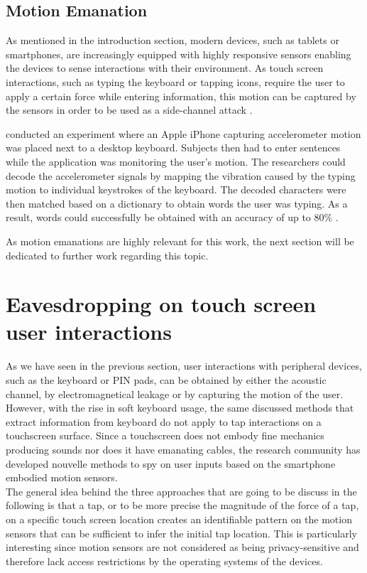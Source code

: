 \subsection{Motion Emanation}
As mentioned in the introduction section, modern devices, such as tablets or smartphones, are increasingly equipped with highly responsive sensors enabling the devices to sense interactions with their environment. As touch screen interactions, such as typing the keyboard or tapping icons, require the user to apply a certain force while entering information, this motion can be captured by the sensors in order to be used as a side-channel attack \cite{Tapprints,Accessory,Touchlogger}.

\citeauthor{Marquardt:2011:IDV:2046707.2046771} conducted an experiment where an Apple iPhone capturing accelerometer motion was placed next to a desktop keyboard. Subjects then had to enter sentences while the application was monitoring the user's motion. The researchers could decode the accelerometer signals by mapping the vibration caused by the typing motion to individual keystrokes of the keyboard. The decoded characters were then matched based on a dictionary to obtain words the user was typing. As a result, words could successfully be obtained with an accuracy of up to 80\% \cite{Marquardt:2011:IDV:2046707.2046771}.

As motion emanations are highly relevant for this work, the next section will be dedicated to further work regarding this topic.

\section{Eavesdropping on touch screen user interactions}
As we have seen in the previous section, user interactions with peripheral devices, such as the keyboard or PIN pads, can be obtained by either the acoustic channel, by electromagnetical leakage or by capturing the motion of the user. However, with the rise in soft keyboard usage, the same discussed methods that extract information from keyboard do not apply to tap interactions on a touchscreen surface. Since a touchscreen does not embody fine mechanics producing sounds nor does it have emanating cables, the research community has developed nouvelle methods to spy on user inputs based on the smartphone embodied motion sensors.\\

The general idea behind the three approaches that are going to be discuss in the following is that a tap, or to be more precise the magnitude of the force of a tap, on a specific touch screen location creates an identifiable pattern on the motion sensors that can be sufficient to infer the initial tap location. This is particularly interesting since motion sensors are not considered as being privacy-sensitive and therefore lack access restrictions by the operating systems of the devices.

